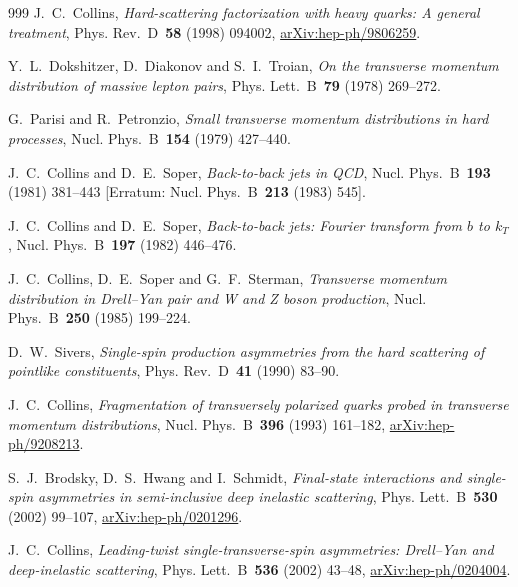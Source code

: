 \begin{thebibliography}{999}
J.~C.~Collins, \emph{Hard-scattering factorization with heavy quarks: A general treatment}, Phys. Rev.~D~\textbf{58} (1998) \mbox{094002}, \href{https://arxiv.org/abs/hep-ph/9806259}{arXiv:hep-ph/9806259}.

Y.~L.~Dokshitzer, D.~Diakonov and S.~I.~Troian, \emph{On the transverse momentum distribution of massive lepton pairs}, Phys. Lett.~B~\textbf{79} (1978) \mbox{269--272}.

G.~Parisi and R.~Petronzio, \emph{Small transverse momentum distributions in hard processes}, Nucl. Phys.~B~\textbf{154} (1979) \mbox{427--440}.

J.~C.~Collins and D.~E.~Soper, \emph{Back-to-back jets in QCD}, Nucl. Phys.~B~\textbf{193} (1981) \mbox{381--443} [Erratum: Nucl. Phys.~B~\textbf{213} (1983) \mbox{545}].

J.~C.~Collins and D.~E.~Soper, \emph{Back-to-back jets: Fourier transform from $b$ to $k_T$}, Nucl. Phys.~B~\textbf{197} (1982) \mbox{446--476}.

J.~C.~Collins, D.~E.~Soper and G.~F.~Sterman, \emph{Transverse momentum distribution in Drell--Yan pair and W and Z boson production}, Nucl. Phys.~B~\textbf{250} (1985) \mbox{199--224}.

D.~W.~Sivers, \emph{Single-spin production asymmetries from the hard scattering of pointlike constituents}, Phys. Rev.~D~\textbf{41} (1990) \mbox{83--90}.

J.~C.~Collins, \emph{Fragmentation of transversely polarized quarks probed in transverse momentum distributions}, Nucl. Phys.~B~\textbf{396} (1993) \mbox{161--182}, \href{https://arxiv.org/abs/hep-ph/9208213}{arXiv:hep-ph/9208213}.

S.~J.~Brodsky, D.~S.~Hwang and I.~Schmidt, \emph{Final-state interactions and single-spin asymmetries in semi-inclusive deep inelastic scattering}, Phys. Lett.~B~\textbf{530} (2002) \mbox{99--107}, \href{https://arxiv.org/abs/hep-ph/0201296}{arXiv:hep-ph/0201296}.

J.~C.~Collins, \emph{Leading-twist single-transverse-spin asymmetries: Drell--Yan and deep-inelastic scattering}, Phys. Lett.~B~\textbf{536} (2002) \mbox{43--48}, \href{https://arxiv.org/abs/hep-ph/0204004}{arXiv:hep-ph/0204004}.


\end{thebibliography}
